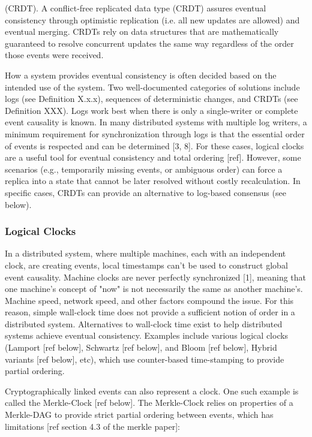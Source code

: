 \documentclass{comjnl}
\begin{document}
\begin{definition} (CRDT). A conflict-free replicated data type (CRDT) assures eventual consistency through optimistic replication (i.e. all new updates are allowed) and eventual merging. CRDTs rely on data structures that are mathematically guaranteed to resolve concurrent updates the same way regardless of the order those events were received. \end{definition} \label{def:crdt}

How a system provides eventual consistency is often decided based on the intended use of the system. Two well-documented categories of solutions include logs (see Definition X.x.x), sequences of deterministic changes, and CRDTs (see Definition XXX). Logs work best when there is only a single-writer or complete event causality is known. In many distributed systems with multiple log writers, a minimum requirement for synchronization through logs is that the essential order of events is respected and can be determined [3, 8]. For these cases, logical clocks are a useful tool for eventual consistency and total ordering [ref]. However, some scenarios (e.g., temporarily missing events, or ambiguous order) can force a replica into a state that cannot be later resolved without costly recalculation. In specific cases, CRDTs can provide an alternative to log-based consensus (see below). 

\subsubsection{Logical Clocks}

In a distributed system, where multiple machines, each with an independent clock, are creating events, local timestamps can’t be used to construct global event causality. Machine clocks are never perfectly synchronized [1], meaning that one machine's concept of "now" is not necessarily the same as another machine's. Machine speed, network speed, and other factors compound the issue. For this reason, simple wall-clock time does not provide a sufficient notion of order in a distributed system. Alternatives to wall-clock time exist to help distributed systems achieve eventual consistency. Examples include various logical clocks (Lamport [ref below], Schwartz [ref below], and Bloom [ref below], Hybrid variants [ref below], etc), which use counter-based time-stamping to provide partial ordering. 

Cryptographically linked events can also represent a clock. One such example is called the Merkle-Clock [ref below]. The Merkle-Clock relies on properties of a Merkle-DAG to provide strict partial ordering between events, which has limitations [ref section 4.3 of the merkle paper]:
\end{document}
